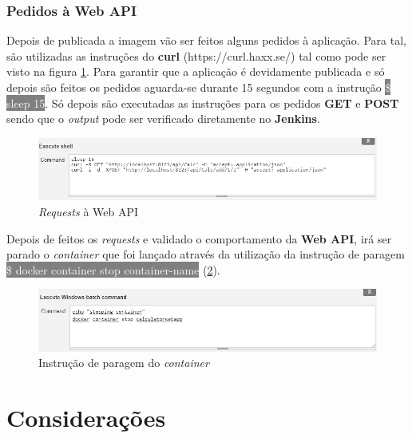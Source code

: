 \subsubsection{Pedidos à Web API}

\hspace{1cm}Depois de publicada a imagem vão ser feitos alguns pedidos à aplicação. Para tal, são utilizadas as instruções do \textbf{curl} (https://curl.haxx.se/) tal como pode ser visto na figura \ref{Fig:Fig75}. Para garantir que a aplicação é devidamente publicada e só depois são feitos os pedidos aguarda-se durante 15 segundos com a instrução \colorbox{gray}{\textcolor{white}{\$ sleep 15}}. Só depois são executadas as instruções para os pedidos \textbf{GET} e \textbf{POST} sendo que o \textit{output} pode ser verificado diretamente no \textbf{Jenkins}. 

\begin{figure}[hbt!]
\centering
\includegraphics[width=0.9\linewidth]{Cap5/JenkinsRequestWebAPI.png}
\caption{\textit{Requests} à Web API}
\label{Fig:Fig75}
\end{figure}

\hspace{1cm}Depois de feitos os \textit{requests} e validado o comportamento da \textbf{Web API}, irá ser parado o \textit{container} que foi lançado através da utilização da instrução de paragem \colorbox{gray}{\textcolor{white}{\$ docker container stop container-name}} (\ref{Fig:Fig76}).

\begin{figure}[hbt!]
\centering
\includegraphics[width=0.9\linewidth]{Cap5/JenkinsStopDockerContainer.png}
\caption{Instrução de paragem do \textit{container}}
\label{Fig:Fig76}
\end{figure}

\section{Considerações}


